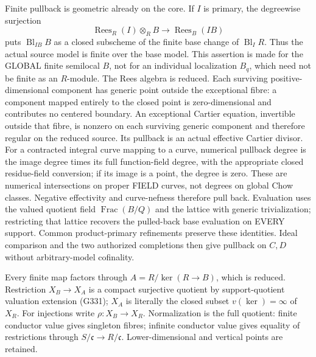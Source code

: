 Finite pullback is geometric already on the core. If $I$ is primary, the degreewise surjection
\[
\operatorname{Rees}_R(I)\otimes_R B\longrightarrow \operatorname{Rees}_B(IB)
\]
puts $\operatorname{Bl}_{IB}B$ as a closed subscheme of the finite base change of $\operatorname{Bl}_I R$. Thus the actual source model is finite over the base model. This assertion is made for the GLOBAL finite semilocal $B$, not for an individual localization $B_q$, which need not be finite as an $R$-module. The Rees algebra is reduced. Each surviving positive-dimensional component has generic point outside the exceptional fibre: a component mapped entirely to the closed point is zero-dimensional and contributes no centered boundary. An exceptional Cartier equation, invertible outside that fibre, is nonzero on each surviving generic component and therefore regular on the reduced source. Its pullback is an actual effective Cartier divisor. For a contracted integral curve mapping to a curve, numerical pullback degree is the image degree times its full function-field degree, with the appropriate closed residue-field conversion; if its image is a point, the degree is zero. These are numerical intersections on proper FIELD curves, not degrees on global Chow classes. Negative effectivity and curve-nefness therefore pull back. Evaluation uses the valued quotient field $\operatorname{Frac}(B/Q)$ and the lattice with generic trivialization; restricting that lattice recovers the pulled-back base evaluation on EVERY support. Common product-primary refinements preserve these identities. Ideal comparison and the two authorized completions then give pullback on $C,D$ without arbitrary-model cofinality.

Every finite map factors through $A=R/\ker(R\to B)$, which is reduced. Restriction $X_B\to X_A$ is a compact surjective quotient by support-quotient valuation extension (G331); $X_A$ is literally the closed subset $v(\ker)=\infty$ of $X_R$. For injections write $\rho:X_B\to X_R$. Normalization is the full quotient: finite conductor value gives singleton fibres; infinite conductor value gives equality of restrictions through $S/\mathfrak c\to R/\mathfrak c$. Lower-dimensional and vertical points are retained.

